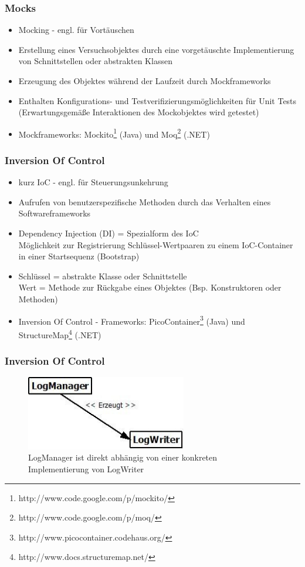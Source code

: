 \documentclass{beamer}
\begin{document}
\begin{frame}
\frametitle{Mocks}
\begin{itemize}
\item Mocking - engl. für Vortäuschen
\item Erstellung eines Versuchsobjektes durch eine vorgetäuschte Implementierung von Schnittstellen oder abstrakten Klassen
\item Erzeugung des Objektes während der Laufzeit durch Mockframeworks
\item Enthalten Konfigurations- und Testverifizierungsmöglichkeiten für Unit Tests (Erwartungsgemäße Interaktionen des Mockobjektes wird getestet)
\item Mockframeworks: Mockito\footnote{http://www.code.google.com/p/mockito/} (Java) und Moq\footnote{http://www.code.google.com/p/moq/} (.NET)
\end{itemize}
\end{frame}

\begin{frame}
\frametitle{Inversion Of Control}
\begin{itemize}
\item kurz IoC - engl. für Steuerungsunkehrung
\item Aufrufen von benutzerspezifische Methoden durch das Verhalten eines Softwareframeworks
\item Dependency Injection (DI) = Spezialform des IoC\\Möglichkeit zur Registrierung Schlüssel-Wertpaaren zu einem IoC-Container in einer Startsequenz (Bootstrap)
\item Schlüssel = abstrakte Klasse oder Schnittstelle\\Wert = Methode zur Rückgabe eines Objektes (Bsp. Konstruktoren oder Methoden)
\item Inversion Of Control - Frameworks:
PicoContainer\footnote{http://www.picocontainer.codehaus.org/} (Java) und StructureMap\footnote{http://www.docs.structuremap.net/} (.NET)
\end{itemize}
\end{frame}

\begin{frame}
\frametitle{Inversion Of Control}
\begin{figure}[htbp]
\includegraphics[width=7cm]{logging_closeCoupled.jpg}
\caption{LogManager ist direkt abhängig von einer konkreten Implementierung von LogWriter}
\end{figure}
\end{frame}
\end{document}
